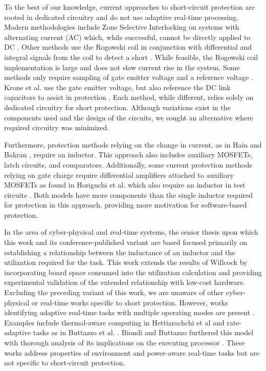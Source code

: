 \documentclass[11pt,oneside]{report}
\begin{document}
    To the best of our knowledge, current approaches to short-circuit protection are rooted in dedicated circuitry and do not use adaptive real-time processing. Modern methodologies include Zone Selective Interlocking on systems with alternating current (AC) which, while successful, cannot be directly applied to DC \cite{scd}. Other methods use the Rogowski coil in conjunction with differential and integral signals from the coil to detect a short \cite{rogowskiCoil}. While feasible, the Rogowski coil implementation is large and does not slow current rise in the system. Some methods only require sampling of gate emitter voltage and a reference voltage \cite{gateChargeChara}. Krone et al. use the gate emitter voltage, but also reference the DC link capacitors to assist in protection \cite{fastAndEasilyImplementable}. Each method, while different, relies solely on dedicated circuitry for short protection. Although variations exist in the components used and the design of the circuits, we sought an alternative where required circuitry was minimized.
    
    Furthermore, protection methods relying on the change in current, as in Hain and Bakran \cite{ultraFastSCD}, require an inductor. This approach also includes auxiliary MOSFETs, latch circuits, and comparators. Additionally, some current protection methods relying on gate charge require differential amplifiers attached to auxiliary MOSFETs as found in Horiguchi et al. which also require an inductor in test circuits \cite{hiSpeedProtection}. Both models have more components than the single inductor required for protection in this approach, providing more motivation for software-based protection.
    
    In the area of cyber-physical and real-time systems, the senior thesis \cite{seniorThesis} upon which this work and its conference-published variant \cite{tufc} are based focused primarily on establishing a relationship between the inductance of an inductor and the utilization required for the task. This work extends the results of Willcock \cite{seniorThesis} by incorporating board space consumed into the utilization calculation and providing experimental validation of the extended relationship with low-cost hardware. Excluding the preceding variant of this work, we are unaware of other cyber-physical or real-time works specific to short protection. However, works identifying adaptive real-time tasks with multiple operating modes are present \cite{modeChangeSystems}. Examples include thermal-aware computing in Hettiarachchi et al \cite{thermalAware} and rate-adaptive tasks as in Buttazzo et al. \cite{rateAdaptive}. Biondi and Buttazzo furthered this model with thorough analysis of its implications on the executing processor \cite{engineCtrl}. These works address properties of environment and power-aware real-time tasks but are not specific to short-circuit protection.
    
\end{document}
